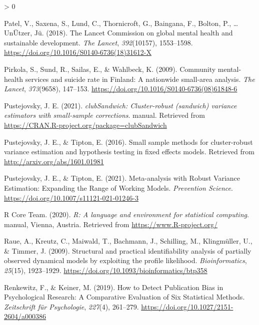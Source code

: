 \documentclass[
  english,
  man]{apa6}
\newlength{\cslhangindent}
\newenvironment{CSLReferences}[2] %
 {%
  \setlength{\parindent}{0pt}
  \ifodd #1 \everypar{\setlength{\hangindent}{\cslhangindent}}\ignorespaces\fi
  \ifnum #2 > 0
  \setlength{\parskip}{#2\baselineskip}
  \fi
 }%
 {}
\begin{document}
\begin{CSLReferences}{1}{0}
\leavevmode\hypertarget{ref-patel2018}{}%
Patel, V., Saxena, S., Lund, C., Thornicroft, G., Baingana, F., Bolton, P., \ldots{} UnÜtzer, Jü. (2018). The {Lancet Commission} on global mental health and sustainable development. \emph{The Lancet}, \emph{392}(10157), 1553--1598. \url{https://doi.org/10.1016/S0140-6736(18)31612-X}

\leavevmode\hypertarget{ref-pirkola2009}{}%
Pirkola, S., Sund, R., Sailas, E., \& Wahlbeck, K. (2009). Community mental-health services and suicide rate in {Finland}: A nationwide small-area analysis. \emph{The Lancet}, \emph{373}(9658), 147--153. \url{https://doi.org/10.1016/S0140-6736(08)61848-6}

\leavevmode\hypertarget{ref-pustejovsky2021a}{}%
Pustejovsky, J. E. (2021). \emph{{clubSandwich}: {Cluster-robust} (sandwich) variance estimators with small-sample corrections}. manual. Retrieved from \url{https://CRAN.R-project.org/package=clubSandwich}

\leavevmode\hypertarget{ref-pustejovsky2016}{}%
Pustejovsky, J. E., \& Tipton, E. (2016). Small sample methods for cluster-robust variance estimation and hypothesis testing in fixed effects models. Retrieved from \url{http://arxiv.org/abs/1601.01981}

\leavevmode\hypertarget{ref-pustejovsky2021}{}%
Pustejovsky, J. E., \& Tipton, E. (2021). Meta-analysis with {Robust Variance Estimation}: {Expanding} the {Range} of {Working Models}. \emph{Prevention Science}. \url{https://doi.org/10.1007/s11121-021-01246-3}

\leavevmode\hypertarget{ref-rcoreteam2020}{}%
R Core Team. (2020). \emph{R: {A} language and environment for statistical computing}. manual, {Vienna, Austria}. Retrieved from \url{https://www.R-project.org/}

\leavevmode\hypertarget{ref-raue2009}{}%
Raue, A., Kreutz, C., Maiwald, T., Bachmann, J., Schilling, M., Klingmüller, U., \& Timmer, J. (2009). Structural and practical identifiability analysis of partially observed dynamical models by exploiting the profile likelihood. \emph{Bioinformatics}, \emph{25}(15), 1923--1929. \url{https://doi.org/10.1093/bioinformatics/btp358}

\leavevmode\hypertarget{ref-renkewitz2019}{}%
Renkewitz, F., \& Keiner, M. (2019). How to {Detect Publication Bias} in {Psychological Research}: {A Comparative Evaluation} of {Six Statistical Methods}. \emph{Zeitschrift für Psychologie}, \emph{227}(4), 261--279. \url{https://doi.org/10.1027/2151-2604/a000386}


\end{CSLReferences}
\end{document}
